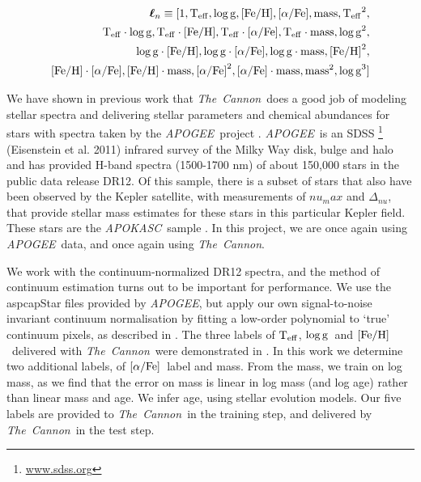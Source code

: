 \documentclass[12pt, preprint]{aastex}
\newcommand{\project}[1]{\textsl{#1}}
\newcommand{\tc}{\project{The~Cannon}}
\newcommand{\apogee}{\project{APOGEE}}
\newcommand{\apokasc}{\project{APOKASC}}
\newcommand{\teff}{\mbox{$\rm T_{eff}$}}
\newcommand{\feh}{\mbox{$\rm [Fe/H]$}}
\newcommand{\alphafe}{\mbox{$\rm [\alpha/Fe]$}}
\newcommand{\logg}{\mbox{$\rm \log g$}}
\newcommand{\set}[1]{\bm{#1}}
\newcommand{\starlabel}{\ell}
\newcommand{\starlabelvec}{\set{\starlabel}}
\begin{document}
\begin{equation}
\begin{split}
\starlabelvec_n \equiv  [1, \teff, \logg, \feh, \alphafe, \mbox{mass}, \teff^2, \\
 \teff\cdot\logg, \teff\cdot\feh, \teff\cdot\alphafe, \teff\cdot \mbox{mass},  \logg^2, \\
  \logg\cdot\feh, \logg\cdot\alphafe, \logg\cdot \mbox{mass}, \feh^2, \\
  \feh\cdot\alphafe, \feh\cdot \mbox{mass}, \alphafe^2, \alphafe\cdot \mbox{mass}, \mbox{mass}^2,  \logg^3]
\end{split}
 \label{eq:quad}
\end{equation}



We have shown in previous work \citep{Ness2015} that \tc\ does a good job
of modeling stellar spectra and delivering stellar parameters and
chemical abundances for stars with spectra taken by the \apogee\ project \citep{Majewski2012}.  \apogee\ is an SDSS \footnote{\url{www.sdss.org}} (Eisenstein et al. 2011) infrared survey of the Milky Way disk, bulge and halo and has provided H-band spectra (1500-1700 nm) of about 150,000 stars in the public data release DR12.  Of this sample, there is a subset of stars that also have been observed by the Kepler satellite, with measurements of ${nu}_max$ and $\Delta_{nu}$, that provide stellar mass estimates for these stars in this particular Kepler field. These stars are the \apokasc\ sample \citep{P2014}. In this project, we are once again using \apogee\ data, and once again
using \tc. 

We work with the continuum-normalized DR12 spectra, and the method of continuum
estimation turns out to be important for performance. We use the aspcapStar files provided by \apogee, but apply our own signal-to-noise invariant continuum normalisation by fitting a low-order polynomial to `true' continuum pixels, as described in \citet{Ness2015}. 
The three labels of \teff, \logg\ and \feh\ delivered with \tc\ were demonstrated in \citet{Ness2015}.  In this work we determine two additional labels, of \alphafe\ label and mass. From the mass, we train on log mass, as we find that the error on mass is linear in log mass (and log age) rather than linear mass and age. We infer age, using stellar evolution models. Our five labels are provided to \tc\ in the training step, and delivered by \tc\ in the test step.
\end{document}
